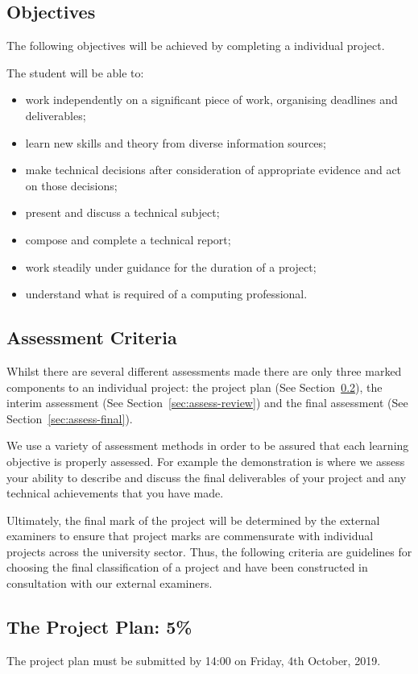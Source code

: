 \documentclass[11pt]{article}
\newcommand{\projectPlanSubmissionDate}{14:00 on Friday, 4th October, 2019}
\newcommand{\planweight}{5\% }
\begin{document}
\subsection*{Objectives}
The following objectives will be achieved by completing a individual project.

The student will be able to:
\begin{itemize}
\item work independently on a significant piece of work, organising deadlines and deliverables;
\item learn new skills and theory from diverse information sources;
\item make technical decisions after consideration of appropriate evidence and act on those decisions;
\item present and discuss a technical subject;
\item compose and complete a technical report;
\item work steadily under guidance for the duration of a project;
\item understand what is required of a computing professional.
\end{itemize}

\subsection{Assessment Criteria}

Whilst there are several different assessments made there are only three marked components to an individual project:  the project plan (See Section~\ref{sec:assess-plan}), the interim assessment (See Section~\ref{sec:assess-review})  and the final assessment (See Section~\ref{sec:assess-final}).

We use a variety of assessment methods in order to be assured that each learning objective is properly assessed.  For example the demonstration is where we assess your ability to describe and discuss the final deliverables of your project and any technical achievements that you have made.

Ultimately, the final mark of the project will be determined by the external examiners to ensure that project marks are commensurate with individual projects across the university sector. Thus, the following criteria are guidelines for choosing the final classification of a project and have been constructed in consultation with our external examiners.

\newpage
\subsection{The Project Plan: \planweight}
\label{sec:assess-plan}
The project plan must be submitted by \projectPlanSubmissionDate.
\end{document}

